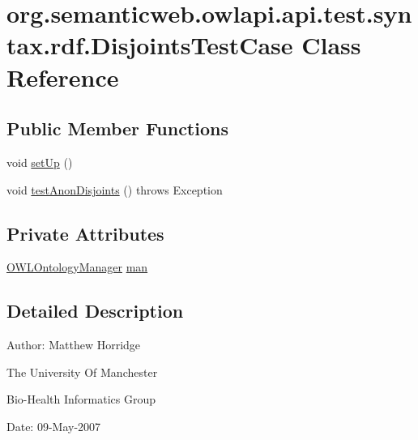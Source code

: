 \hypertarget{classorg_1_1semanticweb_1_1owlapi_1_1api_1_1test_1_1syntax_1_1rdf_1_1_disjoints_test_case}{\section{org.\-semanticweb.\-owlapi.\-api.\-test.\-syntax.\-rdf.\-Disjoints\-Test\-Case Class Reference}
\label{classorg_1_1semanticweb_1_1owlapi_1_1api_1_1test_1_1syntax_1_1rdf_1_1_disjoints_test_case}
}
\subsection*{Public Member Functions}
\begin{DoxyCompactItemize}
\item 
void \hyperlink{classorg_1_1semanticweb_1_1owlapi_1_1api_1_1test_1_1syntax_1_1rdf_1_1_disjoints_test_case_a69e07db02d29380e578d69197fdddf35}{set\-Up} ()
\item 
void \hyperlink{classorg_1_1semanticweb_1_1owlapi_1_1api_1_1test_1_1syntax_1_1rdf_1_1_disjoints_test_case_a8cf5181163ccd7b4a35b2708ca2e9d8e}{test\-Anon\-Disjoints} ()  throws Exception 
\end{DoxyCompactItemize}
\subsection*{Private Attributes}
\begin{DoxyCompactItemize}
\item 
\hyperlink{interfaceorg_1_1semanticweb_1_1owlapi_1_1model_1_1_o_w_l_ontology_manager}{O\-W\-L\-Ontology\-Manager} \hyperlink{classorg_1_1semanticweb_1_1owlapi_1_1api_1_1test_1_1syntax_1_1rdf_1_1_disjoints_test_case_adb81bc21db5fa4aa99ff37b6d3a6dc7f}{man}
\end{DoxyCompactItemize}


\subsection{Detailed Description}
Author\-: Matthew Horridge\par
 The University Of Manchester\par
 Bio-\/\-Health Informatics Group\par
 Date\-: 09-\/\-May-\/2007\par
 \par
 

